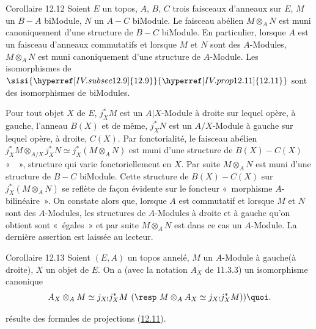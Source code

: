 \documentclass[10pt]{../fichiers-configuration-latex/smfart}
\begin{document}
\begin{enonce*}{Corollaire 12.12}
Soient $E$ un topos, $A$, $B$, $C$ trois faisceaux d'anneaux sur
$E$, $M$ un $B-A$ biModule, $N$ un $A-C$ biModule. Le faisceau
abélien $M\otimes_A N$ est muni canoniquement d'une structure de
$B-C$ biModule. En particulier, lorsque $A$ est un faisceau
d'anneaux commutatifs et lorsque $M$ et $N$ sont des $A$-Modules,
$M\otimes_AN$ est muni canoniquement d'une structure de $A$-Module.
Les isomorphismes de $\sisi{\hyperref[IV.subsec12.9]{12.9}}{\hyperref[IV.prop12.11]{12.11}}$ sont des isomorphismes de
biModules.
\end{enonce*}

Pour tout objet $X$ de $E$, $j^{\ast}_XM$ est un $A| X$-Module à
droite sur lequel opère, à gauche, l'anneau $B(X)$ et de même,
$j^{\ast}_XN$ est un $A/X$-Module à gauche sur lequel opère, à
droite, $C(X)$. Par fonctorialité, le faisceau abélien
$j^{\ast}_XM\otimes_{A/X} j^{\ast}_XN\simeq j^{\ast}_X (M\otimes_A
N)$ est muni d'une structure de $B(X)-C(X)$ «  », structure
qui varie fonctoriellement en $X$. Par suite $M\otimes_A N$ est muni
d'une structure de $B-C$ biModule. Cette structure de $B(X)-C(X)$
 sur $j^{\ast}_X(M\otimes_A N)$ se reflète de façon évidente
sur le foncteur « morphisme $A$-bilinéaire ». On constate alors
que, lorsque $A$ est commutatif et lorsque $M$ et $N$ sont des
$A$-Modules, les structures de $A$-Modules à droite et à gauche
qu'on obtient sont « égales »  et par suite $M\otimes_A N$ est
dans ce cas un $A$-Module. La dernière assertion est laissée au
lecteur.

\begin{enonce*}{Corollaire 12.13}
Soient $(E,A)$ un topos annelé, $M$ un $A$-Module à
gauche\pageoriginale (\resp à droite), $X$ un objet de $E$. On a
(avec la notation $A_X$ de $\hyperref[IV.prop11.3.3]{11.3.3}$) un isomorphisme
canonique
$$
A_X\otimes_AM\simeq j_{X!} j^{\ast}_XM\text{ (\resp } M\otimes_A
A_X\simeq j_{X!}j^{\ast}_XM)){\quoi}.
$$
\end{enonce*}

\noindent {}résulte des formules de projections (\hyperref[IV.prop12.11]{12.11}).
\end{document}
